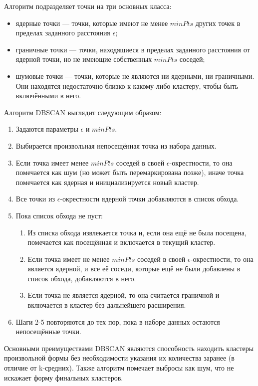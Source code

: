 Алгоритм подразделяет точки на три основных класса:
\begin{itemize}
	\item[---] ядерные точки --- точки, которые имеют не менее $minPts$ других точек в пределах заданного расстояния $\epsilon$;
	\item[---] граничные точки --- точки, находящиеся в пределах заданного расстояния от ядерной точки, но не имеющие собственных $minPts$ соседей;
	\item[---] шумовые точки --- точки, которые не являются ни ядерными, ни граничными. Они находятся недостаточно близко к какому-либо кластеру, чтобы быть включёнными в него.
\end{itemize}
Алгоритм DBSCAN выглядит следующим образом:
\begin{enumerate}
	\item Задаются параметры $\epsilon$ и $minPts$.
	\item Выбирается произвольная непосещённая точка из набора данных.
	\item Если точка имеет менее $minPts$ соседей в своей $\epsilon$-окрестности, то она помечается как шум (но может быть перемаркирована позже), иначе точка помечается как ядерная и инициализируется новый кластер.
	\item Все точки из $\epsilon$-окрестности ядерной точки добавляются в список обхода.
	\item Пока список обхода не пуст:
	\begin{enumerate}
		\item[5.1] Из списка обхода извлекается точка и, если она ещё не была посещена, помечается как посещённая и включается в текущий кластер.
		\item[5.2] Если точка имеет не менее $minPts$ соседей в своей $\epsilon$-окрестности, то она является ядерной, и все её соседи, которые ещё не были добавлены в список обхода, добавляются в него.
		\item[5.3] Если точка не является ядерной, то она считается граничной и включается в кластер без дальнейшего расширения.
	\end{enumerate}
	\item Шаги 2-5 повторяются до тех пор, пока в наборе данных остаются непосещённые точки.
\end{enumerate}
Основными преимуществами DBSCAN являются способность находить кластеры произвольной формы без необходимости указания их количества заранее (в отличие от k-средних). Также алгоритм помечает выбросы как шум, что не искажает форму финальных кластеров.

